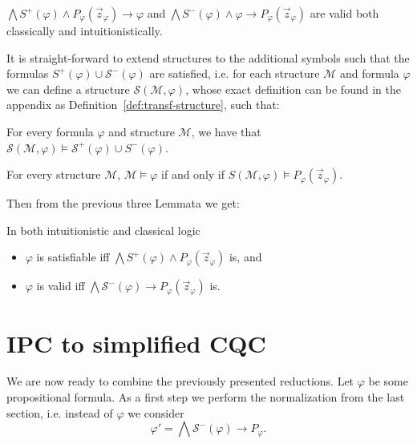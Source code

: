 \documentclass[a4paper,UKenglish,cleveref, autoref, thm-restate]{lipics-v2021}
\begin{document}
\begin{lemma}
	$\bigwedge S^+(\varphi)\wedge P_\varphi(\vec z_\varphi)\to\varphi$ and $\bigwedge S^-(\varphi)\wedge \varphi\to P_\varphi(\vec z_\varphi)$ are valid both classically and intuitionistically.
\end{lemma}

It is straight-forward to extend structures to the additional symbols such that the formulas $S^+(\varphi)\cup\mathcal S^-(\varphi)$ are satisfied, i.e. for each structure $\mathcal M$ and formula $\varphi$ we can define a structure $\mathcal S(\mathcal M, \varphi)$, whose exact definition can be found in the appendix as Definition~\ref{def:transf-structure}, such that:
\begin{lemma}\label{thm:struct1}
For every formula $\varphi$ and structure $\mathcal M$, we have that $\mathcal S(\mathcal M, \varphi)\models\mathcal S^+(\varphi)\cup S^-(\varphi)$.
\end{lemma}

\begin{lemma}\label{thm:struct2}
	For every structure $\mathcal M$,
	$\mathcal M\models \varphi$ if and only if $S(\mathcal M, \varphi)\models P_\varphi(\vec z_\varphi)$.
\end{lemma}

Then from the previous three Lemmata we get:

\begin{corollary}\label{equivalid}
	In both intuitionistic and classical logic
	\begin{itemize}
		\item $\varphi$ is satisfiable iff $\mathcal \bigwedge S^+(\varphi)\wedge P_\varphi(\vec z_\varphi)$ is, and
		\item $\varphi$ is valid iff $\bigwedge\mathcal S^-(\varphi)\to P_\varphi(\vec z_\varphi)$ is.
	\end{itemize}
\end{corollary}

\section{IPC to simplified CQC}

We are now ready to combine the previously presented reductions.
Let $\varphi$ be some propositional formula. As a first step we perform the normalization from the last section, i.e. instead of $\varphi$ we consider $$\varphi' = \bigwedge \mathcal S^-(\varphi)\to P_\varphi.$$
\end{document}
